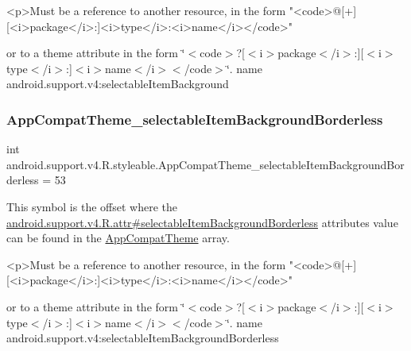 \begin{DoxyVerb}      <p>Must be a reference to another resource, in the form "<code>@[+][<i>package</i>:]<i>type</i>:<i>name</i></code>"
\end{DoxyVerb}
 or to a theme attribute in the form \char`\"{}$<$code$>$?\mbox{[}$<$i$>$package$<$/i$>$\+:\mbox{]}\mbox{[}$<$i$>$type$<$/i$>$\+:\mbox{]}$<$i$>$name$<$/i$>$$<$/code$>$\char`\"{}.  name android.\+support.\+v4\+:selectable\+Item\+Background \mbox{\label{classandroid_1_1support_1_1v4_1_1R_1_1styleable_aabd8d4f3de97874973f63a4e93a5fd9a}} 
\subsubsection{\texorpdfstring{App\+Compat\+Theme\+\_\+selectable\+Item\+Background\+Borderless}{AppCompatTheme\_selectableItemBackgroundBorderless}}
{\footnotesize\ttfamily int android.\+support.\+v4.\+R.\+styleable.\+App\+Compat\+Theme\+\_\+selectable\+Item\+Background\+Borderless = 53\hspace{0.3cm}{\ttfamily [static]}}

This symbol is the offset where the \hyperlink{classandroid_1_1support_1_1v4_1_1R_1_1attr_ab47b2c143ce4560a046c603de1045404}{android.\+support.\+v4.\+R.\+attr\#selectable\+Item\+Background\+Borderless} attribute\textquotesingle{}s value can be found in the \hyperlink{classandroid_1_1support_1_1v4_1_1R_1_1styleable_ac07ebbe62ed977f6dcaadc6397840ace}{App\+Compat\+Theme} array.

\begin{DoxyVerb}      <p>Must be a reference to another resource, in the form "<code>@[+][<i>package</i>:]<i>type</i>:<i>name</i></code>"
\end{DoxyVerb}
 or to a theme attribute in the form \char`\"{}$<$code$>$?\mbox{[}$<$i$>$package$<$/i$>$\+:\mbox{]}\mbox{[}$<$i$>$type$<$/i$>$\+:\mbox{]}$<$i$>$name$<$/i$>$$<$/code$>$\char`\"{}.  name android.\+support.\+v4\+:selectable\+Item\+Background\+Borderless \mbox{\label{classandroid_1_1support_1_1v4_1_1R_1_1styleable_a0aa97271d74700457071ff210723f1c6}} 

